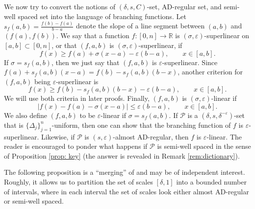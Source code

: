 \documentclass{amsart}
\newcommand{\eps}{\varepsilon}
\newcommand{\cP}{\mathcal{P}}
\begin{document}
We now try to convert the notions of $(\delta, s, C)$-set, AD-regular set, and semi-well spaced set into the language of branching functions. Let $s_f (a, b) = \frac{f(b) - f(a)}{b - a}$ denote the slope of a line segment between $(a, b)$ and $(f(a), f(b))$. We say that a function $f: [0,n]\rightarrow \mathbb{R}$ is $(\sigma, \eps)$-superlinear on $[a,b]\subset [0,n]$, or that $(f, a, b)$ is $(\sigma, \eps)$-superlinear, if 
 \[ f(x)\geq f(a) + \sigma (x-a) - \eps (b - a), \qquad x\in [a, b]. 
 \]
If $\sigma = s_f (a, b)$, then we just say that $(f, a, b)$ is $\eps$-superlinear.
Since $f(a) + s_f (a,b) (x-a) = f(b) - s_f (a,b)(b-x)$, another criterion for $(f, a, b)$ being $\eps$-superlinear is
\begin{equation*}
    f(x) \geq f(b) - s_f (a,b)(b-x) - \eps (b - a), \qquad x \in [a, b].
\end{equation*}
We will use both criteria in later proofs. Finally, $(f, a, b)$ is $(\sigma, \eps)$-linear if
\[ |f(x) - f(a) - \sigma (x-a)| \le \eps (b - a), \qquad x\in [a, b]. 
 \]
We also define $(f, a, b)$ to be $\eps$-linear if $\sigma = s_f (a, b)$. If $\cP$ is a $(\delta, s, \delta^{-\eps})$-set that is $\{ \Delta_j \}_{j=1}^n$-uniform, then one can show that the branching function of $f$ is $\eps$-superlinear. Likewise, if $\cP$ is $(s, \eps)$-almost AD-regular, then $f$ is $\eps$-linear. The reader is encouraged to ponder what happens if $\cP$ is semi-well spaced in the sense of Proposition \ref{prop: key} (the answer is revealed in Remark \ref{rem:dictionary}).

The following proposition is a ``merging'' of \cite[Lemma 2.6 and 2.7]{orponen2023projections} and may be of independent interest. Roughly, it allows us to partition the set of scales $[\delta, 1]$ into a bounded number of intervals, where in each interval the set of scales look either almost AD-regular or semi-well spaced. %
\end{document}
